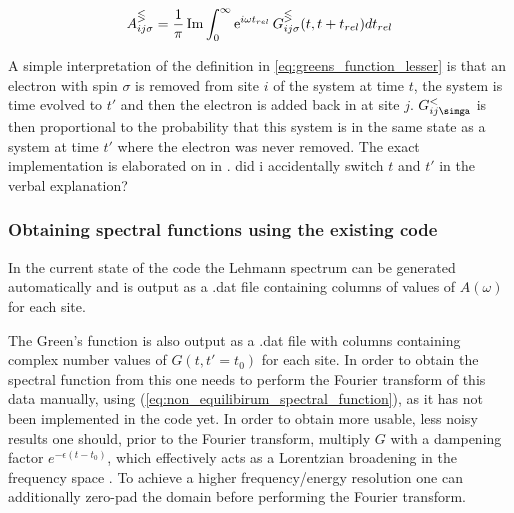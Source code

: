 \begin{equation}
    A_{ij\sigma}^\gtlt = \frac{1}{\pi} \operatorname{Im}\int_0^\infty \operatorname{e}^{i\omega t_{rel}} G_{ij\sigma}^\gtlt (t,t+t_{rel}) dt_{rel}\label{eq:non_equilibirum_spectral_function}
\end{equation}

A simple interpretation of the definition in \ref{eq:greens_function_lesser} is that an electron with spin $\sigma$ is removed from site $i$ of the system at time $t$, the system is time evolved to $t'$ and then the electron is added back in at site $j$. $G_{ij\simga}^{<}$ is then proportional to the probability that this system is in the same state as a system at time $t'$ where the electron was never removed. The exact implementation is elaborated on in \cite{worm_bachelor}. {\color{red} did i accidentally switch $t$ and $t'$ in the verbal explanation?}

\subsubsection{Obtaining spectral functions using the existing code}

In the current state of the code the Lehmann spectrum can be generated automatically and is output as a .dat file containing columns of values of $A(\omega)$ for each site.

\bigskip
The Green's function is also output as a .dat file with columns containing complex number values of $G(t,t'=t_0)$ for each site. In order to obtain the spectral function from this one needs to perform the Fourier transform of this data manually, using (\ref{eq:non_equilibirum_spectral_function}), as it has not been implemented in the code yet. In order to obtain more usable, less noisy results one should, prior to the Fourier transform, multiply $G$ with a dampening factor $e^{-\epsilon (t-t_0)}$, which effectively acts as a Lorentzian broadening in the frequency space \cite{spectral_function}. To achieve a higher frequency/energy resolution one can additionally zero-pad the domain before performing the Fourier transform. 